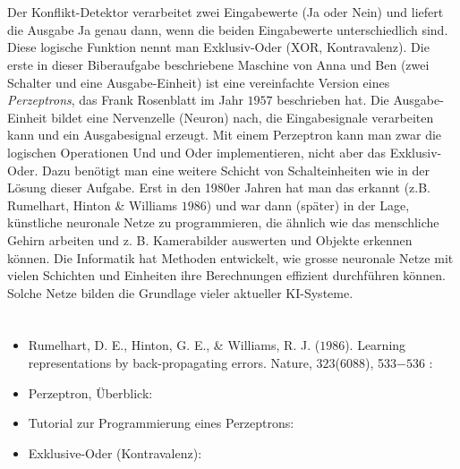 {{\section*{\BrochureItsInformatics}
Der Konflikt-Detektor verarbeitet zwei Eingabewerte (Ja oder Nein) und liefert die Ausgabe Ja genau dann, wenn die beiden Eingabewerte unterschiedlich sind. Diese logische Funktion nennt man Exklusiv-Oder (XOR, Kontravalenz). Die erste in dieser Biberaufgabe beschriebene Maschine von Anna und Ben (zwei Schalter und eine Ausgabe-Einheit) ist eine vereinfachte Version eines \emph{Perzeptrons}, das Frank Rosenblatt im Jahr $1957$ beschrieben hat. Die Ausgabe-Einheit bildet eine Nervenzelle (Neuron) nach, die Eingabesignale verarbeiten kann und ein Ausgabesignal erzeugt. Mit einem Perzeptron kann man zwar die logischen Operationen Und und Oder implementieren, nicht aber das Exklusiv-Oder. Dazu benötigt man eine weitere Schicht von Schalteinheiten wie in der Lösung dieser Aufgabe. Erst in den 1980er Jahren hat man das erkannt (z.B. Rumelhart, Hinton \& Williams $1986$) und war dann (später) in der Lage, künstliche neuronale Netze zu programmieren, die ähnlich wie das menschliche Gehirn arbeiten und z. B. Kamerabilder auswerten und Objekte erkennen können.  Die Informatik hat Methoden entwickelt, wie grosse neuronale Netze mit vielen Schichten und Einheiten ihre Berechnungen effizient durchführen können.  Solche Netze bilden die Grundlage vieler aktueller KI-Systeme.



\section*{\BrochureWebsitesAndKeywords}
{\raggedright
\begin{itemize}
  \item Rumelhart, D. E., Hinton, G. E., \& Williams, R. J. ($1986$). Learning representations by back-propagating errors. Nature, $323$($6088$), 533$-536$ : \href{http://www.cs.toronto.edu/~hinton/absps/naturebp.pdf}{}
  \item Perzeptron, Überblick: \href{https://de.wikipedia.org/wiki/Perzeptron}{}
  \item Tutorial zur Programmierung eines Perzeptrons: \href{https://neuromant.de/2018/11/25/Tutorial_Das-Perzeptron/}{}
  \item Exklusive-Oder (Kontravalenz): \href{https://de.wikipedia.org/wiki/Kontravalenz}{}
\end{itemize}


}}}
